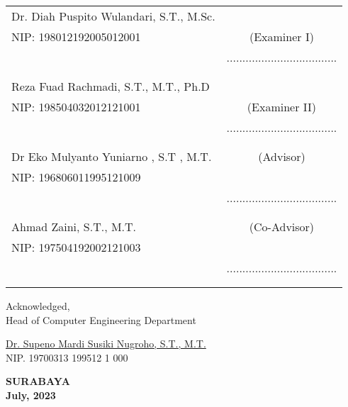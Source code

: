     \noindent
    \begin{tabularx}{\textwidth}{X c}
      Dr. Diah Puspito Wulandari, S.T., M.Sc.    &                 \\
      NIP: 198012192005012001   & (Examiner I)    \\
      & ................................... \\
      &  \\
      &  \\            
      Reza Fuad Rachmadi, S.T., M.T., Ph.D &                 \\
      NIP: 198504032012121001   & (Examiner II) \\
      & ................................... \\
      &  \\
      &  \\                           
      Dr Eko Mulyanto Yuniarno , S.T , M.T.       & (Advisor) \\
      NIP: 196806011995121009      & \\
      & ................................... \\
      &  \\
      &  \\
      Ahmad Zaini, S.T., M.T.     & (Co-Advisor) \\
      NIP: 197504192002121003        & \\
      & ................................... \\
      &  \\
      &  \\
    \end{tabularx}
  \endgroup

  \begin{center}
    Acknowledged, \\
    Head of Computer Engineering Department\\

    \vspace{8ex}

    \underline{Dr. Supeno Mardi Susiki Nugroho, S.T., M.T.} \\
    NIP. 19700313 199512 1 000
  \end{center}

  \begin{center}
    \textbf{SURABAYA\\July, 2023}
  \end{center}
\endgroup
